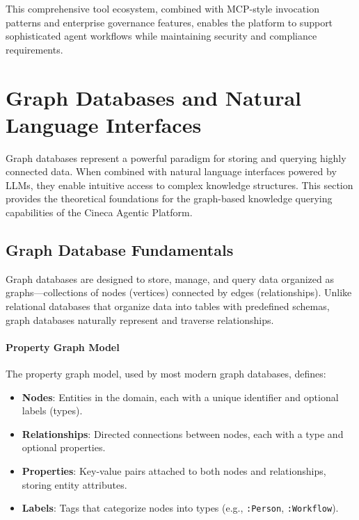 \documentclass[a4paper,twoside]{sapthesis}
\begin{document}
This comprehensive tool ecosystem, combined with MCP-style invocation patterns and enterprise governance features, enables the platform to support sophisticated agent workflows while maintaining security and compliance requirements.

\section{Graph Databases and Natural Language Interfaces}
\label{sec:graph-databases}

Graph databases represent a powerful paradigm for storing and querying highly connected data. When combined with natural language interfaces powered by LLMs, they enable intuitive access to complex knowledge structures. This section provides the theoretical foundations for the graph-based knowledge querying capabilities of the Cineca Agentic Platform.

\subsection{Graph Database Fundamentals}

Graph databases are designed to store, manage, and query data organized as graphs---collections of nodes (vertices) connected by edges (relationships). Unlike relational databases that organize data into tables with predefined schemas, graph databases naturally represent and traverse relationships.

\paragraph{Property Graph Model}

The property graph model, used by most modern graph databases, defines:

\begin{itemize}
    \item \textbf{Nodes}: Entities in the domain, each with a unique identifier and optional labels (types).
    \item \textbf{Relationships}: Directed connections between nodes, each with a type and optional properties.
    \item \textbf{Properties}: Key-value pairs attached to both nodes and relationships, storing entity attributes.
    \item \textbf{Labels}: Tags that categorize nodes into types (e.g., \texttt{:Person}, \texttt{:Workflow}).
\end{itemize}
\end{document}
